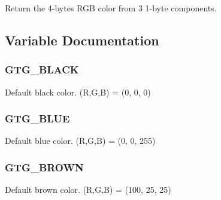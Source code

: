 Return the 4-\/bytes R\-G\-B color from 3 1-\/byte components. 



\subsection{Variable Documentation}
\hypertarget{group__GTGColor_gaa923f594cd6bf3da6a99d672c4438238}{
\subsubsection[{G\-T\-G\-\_\-\-B\-L\-A\-C\-K}]{\setlength{\rightskip}{0pt plus 5cm}G\-T\-G\-\_\-\-B\-L\-A\-C\-K}}\label{group__GTGColor_gaa923f594cd6bf3da6a99d672c4438238}


Default black color. (R,G,B) = (0, 0, 0) 

\hypertarget{group__GTGColor_ga8ee0cf541a8cfe06ca0071bc12730514}{
\subsubsection[{G\-T\-G\-\_\-\-B\-L\-U\-E}]{\setlength{\rightskip}{0pt plus 5cm}G\-T\-G\-\_\-\-B\-L\-U\-E}}\label{group__GTGColor_ga8ee0cf541a8cfe06ca0071bc12730514}


Default blue color. (R,G,B) = (0, 0, 255) 

\hypertarget{group__GTGColor_gadce47970948c2b8fed1561b4ad48a77d}{
\subsubsection[{G\-T\-G\-\_\-\-B\-R\-O\-W\-N}]{\setlength{\rightskip}{0pt plus 5cm}G\-T\-G\-\_\-\-B\-R\-O\-W\-N}}\label{group__GTGColor_gadce47970948c2b8fed1561b4ad48a77d}


Default brown color. (R,G,B) = (100, 25, 25) 

